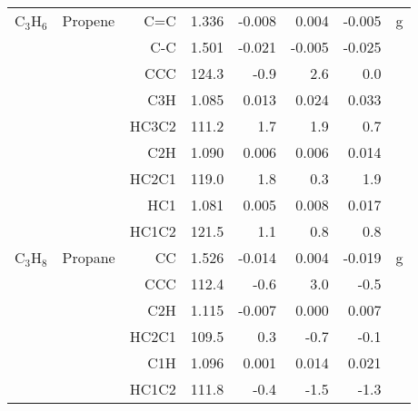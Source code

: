 \begin{table}
\begin{center}
\begin{tabular}{llrrrrrr}
 C$_3$H$_6$        & Propene                            &C=C           &     1.336   &    -0.008 &     0.004 &    -0.005 &     g \\
             &                                    &C-C           &     1.501   &    -0.021 &    -0.005 &    -0.025 &       \\
             &                                    &CCC         &     124.3   &      -0.9 &       2.6 &       0.0   &       \\
             &                                    &C3H           &     1.085   &     0.013 &     0.024 &     0.033 &       \\
             &                                    &HC3C2       &     111.2   &       1.7 &       1.9 &       0.7   &       \\
             &                                    &C2H           &     1.090   &     0.006 &     0.006 &     0.014 &       \\
             &                                    &HC2C1       &     119.0   &       1.8 &       0.3 &       1.9   &       \\
             &                                    &HC1           &     1.081   &     0.005 &     0.008 &     0.017 &       \\
             &                                    &HC1C2       &     121.5   &       1.1 &       0.8 &       0.8   &       \\
 C$_3$H$_8$        & Propane                            &CC            &     1.526   &    -0.014 &     0.004 &    -0.019 &     g \\
             &                                    &CCC         &     112.4   &      -0.6 &       3.0 &      -0.5   &       \\
             &                                    &C2H           &     1.115   &    -0.007 &     0.000 &     0.007 &       \\
             &                                    &HC2C1       &     109.5   &       0.3 &      -0.7 &      -0.1   &       \\
             &                                    &C1H           &     1.096   &     0.001 &     0.014 &     0.021 &       \\
             &                                    &HC1C2       &     111.8   &      -0.4 &      -1.5 &      -1.3   &       \\
\hline
\end{tabular}
\end{center}
\end{table}
\clearpage

